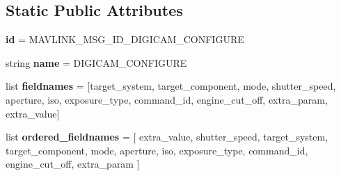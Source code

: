 \subsection*{Static Public Attributes}
\begin{DoxyCompactItemize}
\item 
\mbox{\label{classpymavlink_1_1dialects_1_1v10_1_1MAVLink__digicam__configure__message_a25bc3998ff04868f93123b1002111346}} 
{\bfseries id} = M\+A\+V\+L\+I\+N\+K\+\_\+\+M\+S\+G\+\_\+\+I\+D\+\_\+\+D\+I\+G\+I\+C\+A\+M\+\_\+\+C\+O\+N\+F\+I\+G\+U\+RE
\item 
\mbox{\label{classpymavlink_1_1dialects_1_1v10_1_1MAVLink__digicam__configure__message_a0cf9659886864368eabc20c494543ce5}} 
string {\bfseries name} = \textquotesingle{}D\+I\+G\+I\+C\+A\+M\+\_\+\+C\+O\+N\+F\+I\+G\+U\+RE\textquotesingle{}
\item 
\mbox{\label{classpymavlink_1_1dialects_1_1v10_1_1MAVLink__digicam__configure__message_af640353fae75995f29dafb7e924ef578}} 
list {\bfseries fieldnames} = \mbox{[}\textquotesingle{}target\+\_\+system\textquotesingle{}, \textquotesingle{}target\+\_\+component\textquotesingle{}, \textquotesingle{}mode\textquotesingle{}, \textquotesingle{}shutter\+\_\+speed\textquotesingle{}, \textquotesingle{}aperture\textquotesingle{}, \textquotesingle{}iso\textquotesingle{}, \textquotesingle{}exposure\+\_\+type\textquotesingle{}, \textquotesingle{}command\+\_\+id\textquotesingle{}, \textquotesingle{}engine\+\_\+cut\+\_\+off\textquotesingle{}, \textquotesingle{}extra\+\_\+param\textquotesingle{}, \textquotesingle{}extra\+\_\+value\textquotesingle{}\mbox{]}
\item 
\mbox{\label{classpymavlink_1_1dialects_1_1v10_1_1MAVLink__digicam__configure__message_a704c242f2e66904500213154b5f6f27c}} 
list {\bfseries ordered\+\_\+fieldnames} = \mbox{[} \textquotesingle{}extra\+\_\+value\textquotesingle{}, \textquotesingle{}shutter\+\_\+speed\textquotesingle{}, \textquotesingle{}target\+\_\+system\textquotesingle{}, \textquotesingle{}target\+\_\+component\textquotesingle{}, \textquotesingle{}mode\textquotesingle{}, \textquotesingle{}aperture\textquotesingle{}, \textquotesingle{}iso\textquotesingle{}, \textquotesingle{}exposure\+\_\+type\textquotesingle{}, \textquotesingle{}command\+\_\+id\textquotesingle{}, \textquotesingle{}engine\+\_\+cut\+\_\+off\textquotesingle{}, \textquotesingle{}extra\+\_\+param\textquotesingle{} \mbox{]}

\end{DoxyCompactItemize}
